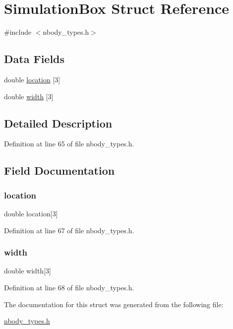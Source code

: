 \hypertarget{struct_simulation_box}{}\section{Simulation\+Box Struct Reference}
\label{struct_simulation_box}


{\ttfamily \#include $<$nbody\+\_\+types.\+h$>$}

\subsection*{Data Fields}
\begin{DoxyCompactItemize}
\item 
double \hyperlink{struct_simulation_box_a95cda27f33ac1484424adb055846a6de}{location} \mbox{[}3\mbox{]}
\item 
double \hyperlink{struct_simulation_box_a02079f68df9f00f088db5a3985bd30a1}{width} \mbox{[}3\mbox{]}
\end{DoxyCompactItemize}


\subsection{Detailed Description}


Definition at line 65 of file nbody\+\_\+types.\+h.



\subsection{Field Documentation}
\hypertarget{struct_simulation_box_a95cda27f33ac1484424adb055846a6de}{}\label{struct_simulation_box_a95cda27f33ac1484424adb055846a6de} 
\subsubsection{\texorpdfstring{location}{location}}
{\footnotesize\ttfamily double location\mbox{[}3\mbox{]}}



Definition at line 67 of file nbody\+\_\+types.\+h.

\hypertarget{struct_simulation_box_a02079f68df9f00f088db5a3985bd30a1}{}\label{struct_simulation_box_a02079f68df9f00f088db5a3985bd30a1} 
\subsubsection{\texorpdfstring{width}{width}}
{\footnotesize\ttfamily double width\mbox{[}3\mbox{]}}



Definition at line 68 of file nbody\+\_\+types.\+h.



The documentation for this struct was generated from the following file\+:\begin{DoxyCompactItemize}
\item 
\hyperlink{nbody__types_8h}{nbody\+\_\+types.\+h}\end{DoxyCompactItemize}
